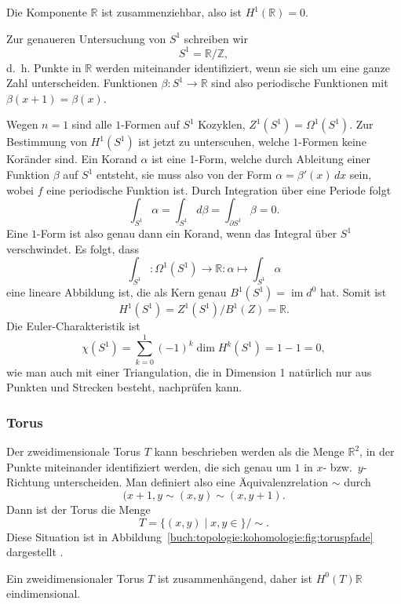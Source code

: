 Die Komponente $\mathbb{R}$ ist zusammenziehbar, also ist $H^1(\mathbb{R})=0$.

Zur genaueren Untersuchung von $S^1$ schreiben wir 
\[
S^1
=
\mathbb{R}/\mathbb{Z},
\]
d.~h. Punkte in $\mathbb{R}$ werden miteinander identifiziert, wenn
sie sich um eine ganze Zahl unterscheiden.
Funktionen $\beta\colon S^1\to\mathbb{R}$ sind also periodische Funktionen 
mit $\beta(x+1)=\beta(x)$.

Wegen $n=1$ sind
alle $1$-Formen auf $S^1$ Kozyklen, $Z^1(S^1)=\Omega^1(S^1)$.
Zur Bestimmung von $H^1(S^1)$ ist jetzt zu unterscuhen,
welche $1$-Formen keine Koränder sind.
Ein Korand $\alpha$ ist eine 1-Form, welche durch Ableitung einer
Funktion $\beta$ auf $S^1$ entsteht, sie muss also von der Form
$\alpha=\beta'(x)\,dx$ sein, wobei $f$ eine periodische Funktion ist.
Durch Integration über eine Periode folgt
\[
\int_{S^1} \alpha
=
\int_{S^1} d\beta
=
\int_{\partial S^1} \beta
=
0.
\]
Eine $1$-Form ist also genau dann ein Korand, wenn das Integral
über $S^1$ verschwindet.
Es folgt, dass
\[
\int_{S^1}
\colon
\Omega^1(S^1)\to \mathbb{R}
:
\alpha
\mapsto
\int_{S^1}\alpha
\]
eine lineare Abbildung ist, die als Kern genau
$B^1(S^1)=\operatorname{im}d^0$ hat.
Somit ist
\[
H^1(S^1)
=
Z^1(S^1) / B^1(Z)
=
\mathbb{R}.
\]
Die Euler-Charakteristik ist
\[
\chi(S^1)
=
\sum_{k=0}^1 (-1)^k\dim H^k(S^1)
=
1-1
=
0,
\]
wie man auch mit einer Triangulation, die in Dimension 1 natürlich nur
aus Punkten und Strecken besteht, nachprüfen kann.

%
%
\subsubsection{Torus}

Der zweidimensionale Torus $T$ kann beschrieben werden als die
Menge $\mathbb{R}^2$, in der Punkte miteinander identifiziert
werden, die sich genau um $1$ in $x$- bzw.~$y$-Richtung unterscheiden.
Man definiert also eine Äquivalenzrelation $\sim$ durch
\[
(x+1,y \sim (x,y) \sim (x,y+1).
\]
Dann ist der Torus die Menge
\[
T
=
\{ (x,y) \mid x,y\in\mathbb\}
/
\sim.
\]
Diese Situation ist in
Abbildung~\ref{buch:topologie:kohomologie:fig:toruspfade}
dargestellt .

Ein zweidimensionaler Torus $T$ ist zusammenhängend, daher ist
$H^0(T)\mathbb{R}$ eindimensional.

